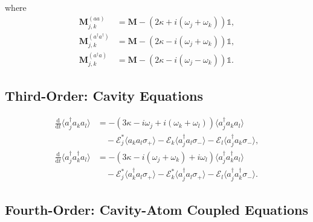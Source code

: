 \documentclass{article}
\newcommand{\ddt}[1][]{\frac{\mathrm{d} #1}{\mathrm{d}t}}
\begin{document}
where
\begin{subequations}
	\begin{align}
		\bm{M}_{j, k}^{(aa)} &= \bm{M} - \left( 2 \kappa + i \left( \omega_{j} + \omega_{k} \right) \right) \mathbb{1}, \\
		\bm{M}_{j, k}^{(a^{\dagger} a^{\dagger})} &= \bm{M} - \left( 2 \kappa - i \left( \omega_{j} + \omega_{k} \right) \right) \mathbb{1}, \\
		\bm{M}_{j, k}^{(a^{\dagger} a)} &= \bm{M} - \left( 2 \kappa - i \left( \omega_{j}- \omega_{k} \right) \right) \mathbb{1}.
	\end{align}
\end{subequations}

\subsection{Third-Order: Cavity Equations}

\begin{subequations}
	\begin{align}
		\ddt \langle a^{\dagger}_{j} a_{k} a_{l} \rangle &= -\left( 3 \kappa - i \omega_{j} + i \left( \omega_{k} + \omega_{l} \right) \right) \langle a^{\dagger}_{j} a_{k} a_{l} \rangle \nonumber \\
		&\quad - \mathcal{E}_{j}^{*} \langle a_{k} a_{l} \sigma_{+} \rangle - \mathcal{E}_{k} \langle a^{\dagger}_{j} a_{l} \sigma_{-} \rangle - \mathcal{E}_{l} \langle a^{\dagger}_{j} a_{k} \sigma_{-} \rangle , \\
		\ddt \langle a^{\dagger}_{j} a^{\dagger}_{k} a_{l} \rangle &= -\left( 3 \kappa - i \left( \omega_{j} + \omega_{k} \right) + i \omega_{l} \right) \langle a^{\dagger}_{j} a^{\dagger}_{k} a_{l} \rangle \nonumber \\
		&\quad - \mathcal{E}_{j}^{*} \langle a^{\dagger}_{k} a_{l} \sigma_{+} \rangle - \mathcal{E}_{k}^{*} \langle a^{\dagger}_{j} a_{l} \sigma_{+} \rangle - \mathcal{E}_{l} \langle a^{\dagger}_{j} a^{\dagger}_{k} \sigma_{-} \rangle .
	\end{align}
\end{subequations}

\subsection{Fourth-Order: Cavity-Atom Coupled Equations}
\end{document}
